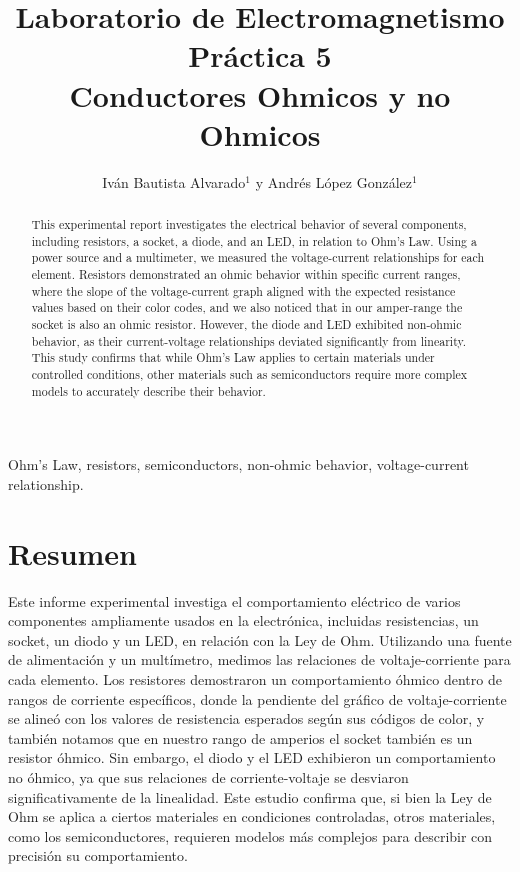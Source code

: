 \documentclass[article,12pt]{elsarticle}
\begin{document}
\begin{frontmatter}
    \title{Laboratorio de Electromagnetismo \\  Práctica  5\\ 
        Conductores Ohmicos y no Ohmicos}
    \author{Iván Bautista Alvarado$^1$ y Andrés López González$^1$} %
    \address{$^1$ Facultad de Ciencias, Universidad Nacional Autónoma de México, M\'exico CDMX.}


    \begin{abstract}
     This experimental report investigates the electrical behavior of several components, including resistors, a socket, a diode, and an LED, in relation to Ohm’s Law. Using a power source and a multimeter, we measured the voltage-current relationships for each element. Resistors demonstrated an ohmic behavior within specific current ranges, where the slope of the voltage-current graph aligned with the expected resistance values based on their color codes, and we also noticed that in our amper-range the socket is also an ohmic resistor. However, the diode and LED exhibited non-ohmic behavior, as their current-voltage relationships deviated significantly from linearity. This study confirms that while Ohm’s Law applies to certain materials under controlled conditions, other materials such as semiconductors require more complex models to accurately describe their behavior.
    \end{abstract}

    \begin{keyword}
     Ohm’s Law, resistors, semiconductors, non-ohmic behavior, voltage-current relationship.
    \end{keyword}
\end{frontmatter}

    
\section*{Resumen}
    Este informe experimental investiga el comportamiento eléctrico de varios componentes ampliamente usados en la electrónica, incluidas resistencias, un socket, un diodo y un LED, en relación con la Ley de Ohm. Utilizando una fuente de alimentación y un multímetro, medimos las relaciones de voltaje-corriente para cada elemento. Los resistores demostraron un comportamiento óhmico dentro de rangos de corriente específicos, donde la pendiente del gráfico de voltaje-corriente se alineó con los valores de resistencia esperados según sus códigos de color, y también notamos que en nuestro rango de amperios el socket también es un resistor óhmico. Sin embargo, el diodo y el LED exhibieron un comportamiento no óhmico, ya que sus relaciones de corriente-voltaje se desviaron significativamente de la linealidad. Este estudio confirma que, si bien la Ley de Ohm se aplica a ciertos materiales en condiciones controladas, otros materiales, como los semiconductores, requieren modelos más complejos para describir con precisión su comportamiento.
\end{document}
